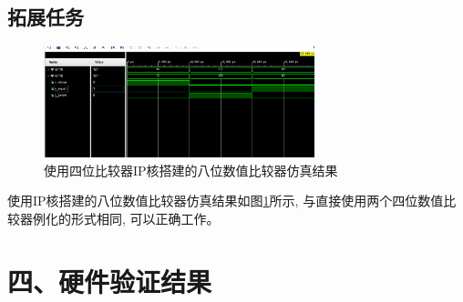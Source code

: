 \documentclass{article}
\newcommand{\fourhao}{\fontsize{14pt}{\baselineskip}\selectfont} %
\newcommand{\xiaosihao}{\fontsize{12pt}{\baselineskip}\selectfont} %
\begin{document}
\subsection*{拓展任务}
\begin{figure}[H]
    \centering
    \includegraphics[width=0.7\textwidth]{image/2024-06-15-22-19-35.png}
    \caption{使用四位比较器IP核搭建的八位数值比较器仿真结果}
    \label{image_useIP_2}
\end{figure}
使用IP核搭建的八位数值比较器仿真结果如图\ref{image_useIP_2}所示, 与直接使用两个四位数值比较器例化的形式相同, 可以正确工作。
\section*{\fourhao 四、硬件验证结果}
\xiaosihao
{}
\end{document}
